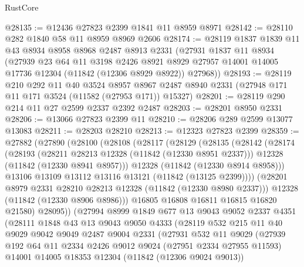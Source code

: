 \begin{lexlean}{RustCore}
\begin{coremodule}
@28135 := @12436 @27823 @2399 @1841 @11 @8959 @8971
@28142 := @28110 @282 @1840 @58 @11 @8959 @8969 @2606
@28174 := @28119
    @1837
    @1839
    @11
    @43
    @8934
    @8958
    @8968
    @2487
    @8913
    @2331
    (@27931
      @1837
      @11
      @8934
      (@27939
        @23
        @64
        @11
        @3198
        @2426
        @8921
        @8929
        @27957
        @14001
        @14005
        @17736
        @12304
        (@11842 (@12306 @8929 @8922))
        @27968))
@28193 := @28119
    @210
    @292
    @11
    @40
    @3524
    @8957
    @8967
    @2487
    @8940
    @2331
    (@27948 @171 @11 @171 @3524 (@11582 (@27953 @171)) @15327)
@28201 := @28119 @290 @214 @11 @27 @2599 @2337 @2392 @2487
@28203 := @28201 @8950 @2331
@28206 := @13066 @27823 @2399 @11
@28210 := @28206 @289 @2599 @13077 @13083
@28211 := @28203 @28210
@28213 := @12323 @27823 @2399
@28359 := @27882
    (@27890
      (@28100
        (@28108
          (@28117
            (@28129
              (@28135
                (@28142
                  (@28174
                    (@28193
                      (@28211 @28213 @12328 (@11842 (@12330 @8951 @2337)))
                      @12328
                      (@11842 (@12330 @8941 @8957)))
                    @12328
                    (@11842 (@12330 @8914 @8958)))
                  @13106
                  @13109
                  @13112
                  @13116
                  @13121
                  (@11842 (@13125 @2399))))
              (@28201 @8979 @2331 @28210 @28213 @12328 (@11842 (@12330 @8980 @2337)))
              @12328
              (@11842 (@12330 @8906 @8986)))
            @16805
            @16808
            @16811
            @16815
            @16820
            @21580)
          @28095))
      (@27994
        @8999
        @1849
        @677
        @13
        @9043
        @9052
        @2337
        @4351
        (@28111
          @1848
          @43
          @13
          @9043
          @9050
          @4333
          (@28119
            @532
            @215
            @11
            @40
            @9029
            @9042
            @9049
            @2487
            @9004
            @2331
            (@27931
              @532
              @11
              @9029
              (@27939
                @192
                @64
                @11
                @2334
                @2426
                @9012
                @9024
                (@27951 @2334 @27955 @11593)
                @14001
                @14005
                @18353
                @12304
                (@11842 (@12306 @9024 @9013))

\end{coremodule}
\end{lexlean}

